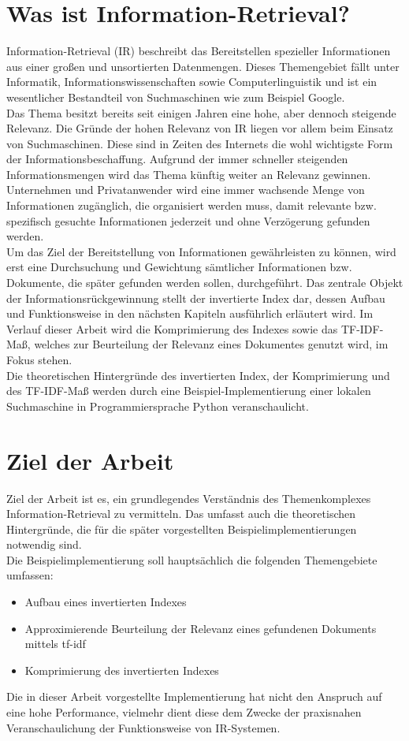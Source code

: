 \section{Was ist Information-Retrieval?}
Information-Retrieval (IR) beschreibt das Bereitstellen spezieller Informationen aus einer großen und unsortierten Datenmengen. Dieses Themengebiet fällt unter Informatik, Informationswissenschaften sowie Computerlinguistik und ist ein wesentlicher Bestandteil von Suchmaschinen wie zum Beispiel Google.
\\
Das Thema besitzt bereits seit einigen Jahren eine hohe, aber dennoch steigende Relevanz. Die Gründe der hohen Relevanz von IR liegen vor allem beim Einsatz von Suchmaschinen. Diese sind in Zeiten des Internets die wohl wichtigste Form der Informationsbeschaffung. Aufgrund der immer schneller steigenden Informationsmengen wird das Thema künftig weiter an Relevanz gewinnen. Unternehmen und Privatanwender wird eine immer wachsende Menge von Informationen zugänglich, die organisiert werden muss, damit relevante bzw. spezifisch gesuchte Informationen jederzeit und ohne Verzögerung gefunden werden.
\\
Um das Ziel der Bereitstellung von Informationen gewährleisten zu können, wird erst eine Durchsuchung und Gewichtung sämtlicher Informationen bzw. Dokumente, die später gefunden werden sollen, durchgeführt. Das zentrale Objekt der Informationsrückgewinnung stellt der invertierte Index dar, dessen Aufbau und Funktionsweise in den nächsten Kapiteln ausführlich erläutert wird. Im Verlauf dieser Arbeit wird die Komprimierung des Indexes sowie das TF-IDF-Maß, welches zur Beurteilung der Relevanz eines Dokumentes genutzt wird, im Fokus stehen.
\\
Die theoretischen Hintergründe des invertierten Index, der Komprimierung und des TF-IDF-Maß werden durch eine Beispiel-Implementierung einer lokalen Suchmaschine in Programmiersprache Python veranschaulicht.

\section{Ziel der Arbeit}
Ziel der Arbeit ist es, ein grundlegendes Verständnis des Themenkomplexes Information-Retrieval zu vermitteln. Das umfasst auch die theoretischen Hintergründe, die für die später vorgestellten Beispielimplementierungen notwendig sind.
\\
Die Beispielimplementierung soll hauptsächlich die folgenden Themengebiete umfassen:\\
\begin{itemize}
	\item Aufbau eines invertierten Indexes
	\item Approximierende Beurteilung der Relevanz eines gefundenen Dokuments mittels tf-idf
	\item Komprimierung des invertierten Indexes
\end{itemize}
Die in dieser Arbeit vorgestellte Implementierung hat nicht den Anspruch auf eine hohe Performance, vielmehr dient diese dem Zwecke der praxisnahen Veranschaulichung der Funktionsweise von IR-Systemen.

